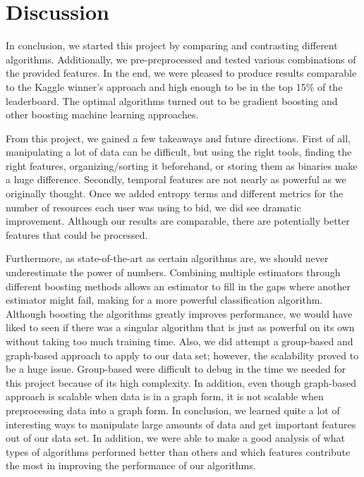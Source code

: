 \documentclass{article} %
\begin{document}
\section{Discussion}

In conclusion, we started this project by comparing and contrasting different algorithms.
Additionally, we pre-preprocessed and tested various combinations of the provided features.
In the end, we were pleased to produce results comparable to the Kaggle winner's approach and high enough to be in the top 15\% of the leaderboard.
The optimal algorithms turned out to be gradient boosting and other boosting machine learning approaches.

From this project, we gained a few takeaways and future directions.
First of all, manipulating a lot of data can be difficult, but using the right tools, finding the right features, organizing/sorting it beforehand, or storing them as binaries make a huge difference.
Secondly, temporal features are not nearly as powerful as we originally thought.
Once we added entropy terms and different metrics for the number of resources each user was using to bid, we did see dramatic improvement.
Although our results are comparable, there are potentially better features that could be processed.

Furthermore, as state-of-the-art as certain algorithms are, we should never underestimate the power of numbers.
Combining multiple estimators through different boosting methods allows an estimator to fill in the gaps where another estimator might fail, making for a more powerful classification algorithm.
Although boosting the algorithms greatly improves performance, we would have liked to seen if there was a singular algorithm that is just as powerful on its own without taking too much training time.
Also, we did attempt a group-based and graph-based approach to apply to our data set; however, the scalability proved to be a huge issue.
Group-based were difficult to debug in the time we needed for this project because of its high complexity.
In addition, even though graph-based approach is scalable when data is in a graph form, it is not scalable when preprocessing data into a graph form.
In conclusion, we learned quite a lot of interesting ways to manipulate large amounts of data and get important features out of our data set.
In addition, we were able to make a good analysis of what types of algorithms performed better than others and which features contribute the most in improving the performance of our algorithms.
\end{document}
